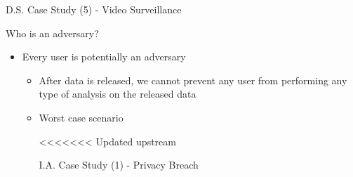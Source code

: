 \documentclass[
 size=14pt,
 paper=smartboard,  %
 mode=present, 		%
 display=slides, 	%
 style=tuliplab,  	%
 pauseslide,
 fleqn,leqno]{powerdot}
\begin{document}
\begin{slide}[toc=,bm=]{D.S. Case Study (5) - Video Surveillance}
\begin{slide}[toc=,bm=]{Who is an adversary?}

\begin{itemize}
\item
Every user is potentially an adversary

\begin{itemize}
\item
After data is released, we cannot prevent any user from performing any type of analysis on the released data

\item
Worst case scenario

<<<<<<< Updated upstream
\begin{slide}[toc=,bm=]{I.A. Case Study (1) - Privacy Breach}


\end{slide}
\end{itemize}
\end{itemize}
\end{slide}
\end{slide}
\end{document}
